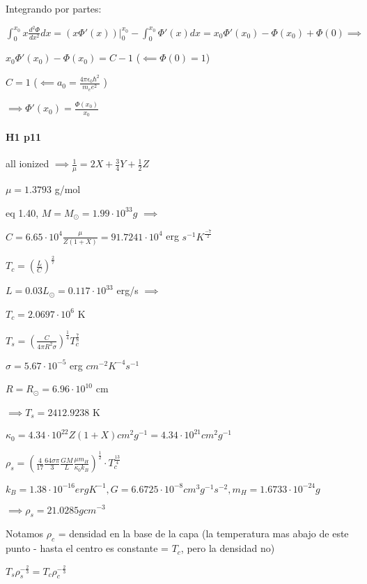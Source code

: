 \documentclass[12pt]{book}
\begin{document}
Integrando por partes:

$\int_0^{x_0}{x \frac{d^2\Phi}{dx^2} dx } = (x \Phi'(x))|_0^{x_0} - \int_0^{x_0}{\Phi'(x) dx } = x_0 \Phi'(x_0) - \Phi(x_0) + \Phi(0) \implies$

$x_0 \Phi'(x_0) - \Phi(x_0) = C - 1$ ($\impliedby \Phi(0)=1$)

$C = 1$ ($\impliedby a_0 = \frac{4 \pi \epsilon_0 \hbar^2}{m_e e^2}$ )

 
$\implies  \Phi'(x_0) = \frac{ \Phi(x_0)}{x_0}$

\paragraph{H1 p11}


all ionized $\implies \frac{1}{\mu} = 2 X + \frac{3}{4} Y + \frac{1}{2} Z$

$\mu  = 1.3793$ g/mol

eq 1.40, $M = M_{\odot} = 1.99 \cdot 10^{33}g$ $\implies$

$C = 6.65 \cdot 10^4 \frac{\mu}{Z(1+X)} = 91.7241 \cdot 10^4$ erg $s^{-1} K^{\frac{-7}{2}}$ 

$T_c = (\frac{L}{C})^{\frac{2}{7}}$

$L = 0.03 L_{\odot} = 0.117 \cdot 10^{33} $ erg/s $\implies$

$T_c = 2.0697 \cdot 10^6$ K

$T_s = (\frac{C}{4 \pi R^2 \sigma})^{\frac{1}{4}} T_c^{\frac{7}{8}}$

$\sigma = 5.67 \cdot 10^{-5}$ erg $cm^{-2} K^{-4} s^{-1}$

$R = R_{\odot} = 6.96 \cdot 10^{10}$ cm

$\implies T_s = 2412.9238$ K

$\kappa_0 = 4.34 \cdot 10^{22} Z (1+X) cm^2 g^{-1} = 4.34 \cdot 10^{21} cm^2 g^{-1}$

$\rho_s = (\frac{4}{17} \frac{64 \sigma \pi}{3} \frac{GM}{L} \frac{\mu m_H }{\kappa_0 k_B} )^{\frac{1}{2}} \cdot T_c^{\frac{13}{4}}$

$k_B = 1.38 \cdot 10^{-16} erg K^{-1}, G = 6.6725 \cdot 10^{-8} cm^3 g^{-1} s^{-2}, m_H = 1.6733 \cdot 10^{-24} g$

$\implies \rho_s = 21.0285 g cm^{-3}$

Notamos $\rho_c$ = densidad en la base de la capa (la temperatura mas abajo de este punto - hasta el centro es constante = $T_c$, pero la densidad no)

$T_s \rho_s^{-\frac{2}{3}} = T_c \rho_c^{-\frac{2}{3}}$
\end{document}
